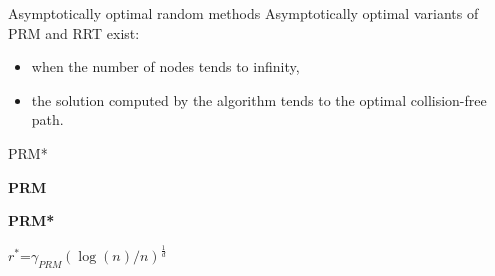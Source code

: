 %
%

\begin{frame} {Asymptotically optimal random methods}
  Asymptotically optimal variants of PRM and RRT exist:
  \begin{itemize}
  \item when the number of nodes tends to infinity,
  \item the solution computed by the algorithm tends to the optimal
    collision-free path.
  \end{itemize}
\end{frame}

%
%

\begin{frame} {PRM*}
  \parbox{.49\linewidth} {
    \begin{algorithmic}
      \STATE \textbf{PRM}
      \ENDIF
      \ENDFOR
      \ENDFOR
    \end{algorithmic}
  }
  \pause
  \parbox{.49\linewidth} {
    \begin{algorithmic}
      \STATE \textbf{PRM*}
      \ENDFOR
      \ENDFOR
    \end{algorithmic}
    {\color{red}$r^{*}$}=$\gamma_{PRM}(\log(n)/n)^{\frac{1}{d}}$
  }
\end{frame}

%
%

